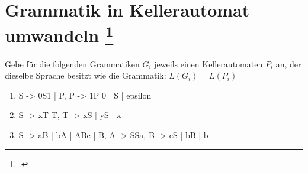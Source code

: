 \documentclass{lehramt-informatik-aufgabe}
\begin{document}
\section{Grammatik in Kellerautomat umwandeln
\footcite{theo:ab:2}}

Gebe für die folgenden Grammatiken $G_i$ jeweils einen Kellerautomaten
$P_i$ an, der dieselbe Sprache besitzt wie die Grammatik: $L(G_i) =
L(P_i)$

\begin{enumerate}


\item

\begin{liProduktionsRegeln}
S -> 0S1 | P,
P -> 1P 0 | S | epsilon
\end{liProduktionsRegeln}


\item

\begin{liProduktionsRegeln}
S -> xT T,
T -> xS | yS | x
\end{liProduktionsRegeln}


\item

\begin{liProduktionsRegeln}
S -> aB | bA | ABc | B,
A -> SSa,
B -> cS | bB | b
\end{liProduktionsRegeln}
\end{enumerate}
\end{document}
